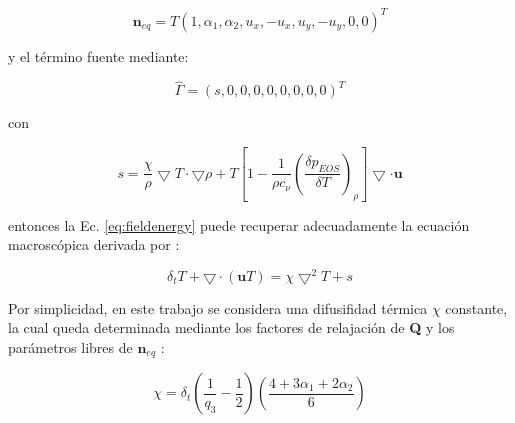 \begin{equation}
    {\mathbf{n}}_{eq} = T { \left( 1, \alpha_{1}, \alpha_{2}, u_{x}, -u_{x}, u_{y}, -u_{y}, 0, 0 \right) }^{T}
\end{equation}

y el término fuente mediante:

\begin{equation}
    \hat{\Gamma} = {( s, 0, 0, 0, 0, 0, 0, 0, 0 )}^{T}
\end{equation}

con 

\begin{equation}
    s = \frac{\chi}{\rho} \bigtriangledown T \cdot \bigtriangledown \rho + T \left[ 1 - \frac{1}{\rho c_{\nu}} {\left( \frac{\delta p_{EOS}}{\delta T} \right)}_{\rho} \right] \bigtriangledown \cdot \mathbf{u}
\end{equation}

entonces la Ec. \ref{eq:fieldenergy} puede recuperar adecuadamente la ecuación macroscópica derivada por \cite{markus2011simulation}:

\begin{equation}
    \delta_{t} T + \bigtriangledown \cdot ( \mathbf{u} T ) = \chi {\bigtriangledown }^{2} T + s
\end{equation}

Por simplicidad, en este trabajo se considera una difusifidad térmica $\chi$ constante, la cual queda determinada mediante los factores de relajación de \textbf{Q} y los parámetros libres de ${\textbf{n}}_{eq}$ :

\begin{equation}
    \chi = \delta_{t} \left( \frac{1}{q_{3}} - \frac{1}{2} \right) \left( \frac{ 4 + 3 \alpha_{1} + 2 \alpha_{2}}{6} \right)
\end{equation}




